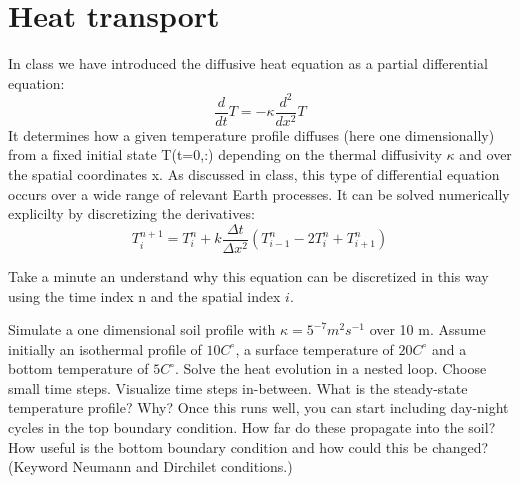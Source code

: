 \section{Heat transport}
In class we have introduced the diffusive heat equation as a partial differential equation:
$$
\frac{d}{dt}T = -\kappa\frac{d^2}{dx^2}T
$$
It determines how a given temperature profile diffuses (here one dimensionally) from a fixed initial state T(t=0,:) depending on the thermal diffusivity $\kappa$ and over the spatial coordinates x. As discussed in class, this type of differential equation occurs over a wide range of relevant Earth processes. It can be solved numerically explicilty by discretizing the derivatives:
$$
T^{n+1}_{i} = T^{n}_{i} + k\frac{\Delta t}{\Delta x^2}\left(T^{n}_{i-1} - 2T^{n}_{i}+T^{n}_{i+1} \right)
$$

Take a minute an understand why this equation can be discretized in this way using the time index n and the spatial index $i$. 

Simulate a one dimensional soil profile with $\kappa = 5^{-7} m^2 s^{-1}$ over 10 m. Assume initially an isothermal profile of $10 C^{\circ}$, a surface temperature of $20 C^{\circ}$ and a bottom temperature of $5 C^{\circ}$. Solve the heat evolution in a nested loop. Choose small time steps. Visualize time steps in-between. What is the steady-state temperature profile? Why? Once this runs well, you can start including day-night cycles in the top boundary condition. How far do these propagate into the soil? How useful is the bottom boundary condition and how could this be changed? (Keyword Neumann and Dirchilet conditions.)

\ifanswers
\begin{tcolorbox}[enhanced jigsaw,breakable,pad at break*=1mm,
    colback=blue!5!white,colframe=babyblueeyes,title=Solutions,
    watermark color=white]
    
\end{tcolorbox}
\fi
